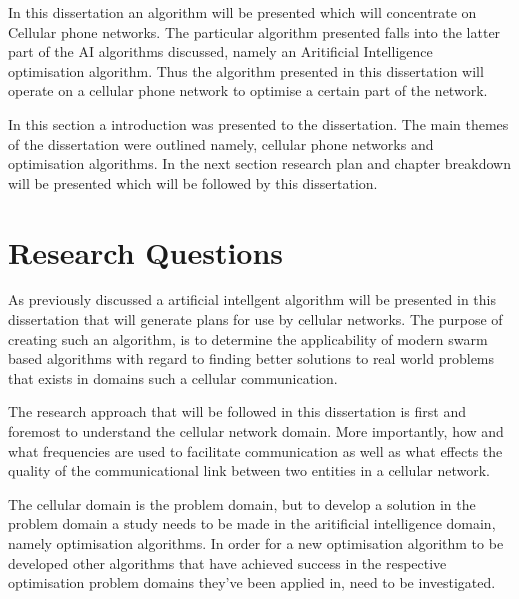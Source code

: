 In this dissertation an algorithm will be presented which will concentrate on Cellular phone networks. The particular algorithm presented falls into the latter part of the AI algorithms discussed, namely an Aritificial Intelligence optimisation algorithm. Thus the algorithm presented in this dissertation will operate on a cellular phone network to optimise a certain part of the network.

In this section a introduction was presented to the dissertation. The main themes of the dissertation were outlined namely, cellular phone networks and optimisation algorithms. In the next section research plan and chapter breakdown will be presented which will be followed by this dissertation.
\section{Research Questions}
As previously discussed a artificial intellgent algorithm will be presented in this dissertation that will generate plans for use by cellular networks. The purpose of creating such an algorithm, is to determine the applicability of modern swarm based algorithms with regard to finding better solutions to real world problems that exists in domains such a cellular communication.

The research approach that will be followed in this dissertation is first and foremost to understand the cellular network domain. More importantly, how and what frequencies are used to facilitate communication as well as what effects the quality of the communicational link between two entities in a cellular network. 

The cellular domain is the problem domain, but to develop a solution in the problem domain a study needs to be made in the aritificial intelligence domain, namely optimisation algorithms. In order for a new optimisation algorithm to be developed other algorithms that have achieved success in the respective optimisation problem domains they've been applied in, need to be investigated.

